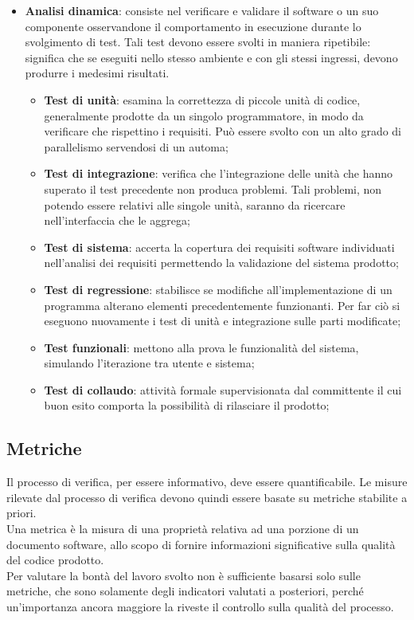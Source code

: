 {\begin{itemize}
\begin{itemize}
		\end{itemize}
		
		\item \textbf{Analisi dinamica}: consiste nel verificare e validare il software o un suo componente osservandone il comportamento in esecuzione durante lo svolgimento di test. Tali test devono essere svolti in maniera ripetibile: significa che se eseguiti nello stesso ambiente e con gli stessi ingressi, devono produrre i medesimi risultati.
		\begin{itemize}
			\item \textbf{Test di unità}: esamina la correttezza di piccole unità di codice, generalmente prodotte da un singolo programmatore, in modo da verificare che  rispettino i requisiti. Può essere svolto con un alto grado di parallelismo servendosi di un automa;		
			\item \textbf{Test di integrazione}: verifica che l'integrazione delle unità che hanno superato il test precedente non produca problemi. Tali problemi, non potendo essere relativi alle singole unità, saranno da ricercare nell'interfaccia che le aggrega;	
			\item \textbf{Test di sistema}: accerta la copertura dei requisiti\ped{g} software individuati nell'analisi dei requisiti permettendo la validazione del sistema prodotto;
			\item \textbf{Test di regressione}: stabilisce se modifiche all'implementazione di un programma alterano elementi precedentemente funzionanti. Per far ciò si eseguono nuovamente i test di unità e integrazione sulle parti modificate;			
			\item \textbf{Test funzionali}: mettono alla prova le funzionalità del sistema, simulando l'iterazione tra utente e sistema;				
			\item \textbf{Test di collaudo}: attività formale supervisionata dal committente il cui buon esito comporta la possibilità di rilasciare il prodotto;
		\end{itemize}
	\end{itemize}
	}
\subsection{Metriche}{
	\label{sec:metriche}
	Il processo di verifica, per essere informativo, deve essere quantificabile. Le misure rilevate dal processo di verifica devono quindi essere basate su metriche stabilite a priori. \\
	Una metrica è la misura di una proprietà relativa ad una porzione di un documento software, allo scopo di fornire informazioni significative sulla qualità del codice prodotto. \\
	Per valutare la bontà del lavoro svolto non è sufficiente basarsi solo sulle metriche, che sono solamente degli indicatori valutati a posteriori, perché un'importanza ancora maggiore la riveste il controllo sulla qualità del processo.
	}

